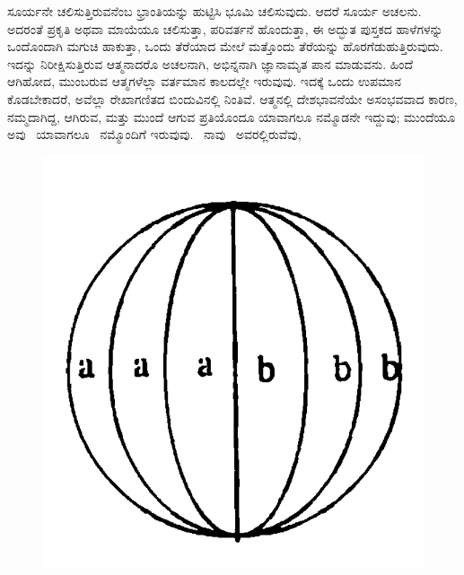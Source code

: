 ಸೂರ್ಯನೇ ಚಲಿಸುತ್ತಿರುವನೆಂಬ ಭ್ರಾಂತಿಯನ್ನು ಹುಟ್ಟಿಸಿ ಭೂಮಿ ಚಲಿಸುವುದು. ಆದರೆ ಸೂರ್ಯ ಅಚಲನು. ಅದರಂತೆ ಪ್ರಕೃತಿ ಅಥವಾ ಮಾಯೆಯೂ ಚಲಿಸುತ್ತಾ, ಪರಿವರ್ತನೆ ಹೊಂದುತ್ತಾ, ಈ ಅದ್ಭುತ ಪುಸ್ತಕದ ಹಾಳೆಗಳನ್ನು ಒಂದೊಂದಾಗಿ ಮಗುಚಿ ಹಾಕುತ್ತಾ, ಒಂದು ತೆರೆಯಾದ ಮೇಲೆ ಮತ್ತೊಂದು ತೆರೆಯನ್ನು ಹೊರಗೆಡುಹುತ್ತಿರುವುದು. ಇದನ್ನು ನಿರೀಕ್ಷಿಸುತ್ತಿರುವ ಆತ್ಮನಾದರೊ ಅಚಲನಾಗಿ, ಅಭಿನ್ನನಾಗಿ ಜ್ಞಾನಾಮೃತ ಪಾನ ಮಾಡುವನು. ಹಿಂದೆ ಆಗಿಹೋದ, ಮುಂಬರುವ ಆತ್ಮಗಳೆಲ್ಲಾ ವರ್ತಮಾನ ಕಾಲದಲ್ಲೇ ಇರುವುವು. ಇದಕ್ಕೆ ಒಂದು ಉಪಮಾನ ಕೊಡಬೇಕಾದರೆ, ಅವೆಲ್ಲಾ ರೇಖಾಗಣಿತದ ಬಿಂದುವಿನಲ್ಲಿ ನಿಂತಿವೆ. ಆತ್ಮನಲ್ಲಿ ದೇಶಭಾವನೆಯೇ ಅಸಂಭವವಾದ ಕಾರಣ, ನಮ್ಮದಾಗಿದ್ದ, ಆಗಿರುವ, ಮತ್ತು ಮುಂದೆ ಆಗುವ ಪ್ರತಿಯೊಂದೂ ಯಾವಾಗಲೂ ನಮ್ಮೊಡನೇ ಇದ್ದುವು; ಮುಂದೆಯೂ ಅವು~ ಯಾವಾಗಲೂ~ ನಮ್ಮೊಂದಿಗೆ ಇರುವುವು.~ ನಾವು ~ಅವರಲ್ಲಿರುವೆವು,

\vspace{-0.05cm}

\vspace{0.1cm}

\begin{figure}
  \centering
  \includegraphics{images/0002.jpg}
    \end{figure}
   

